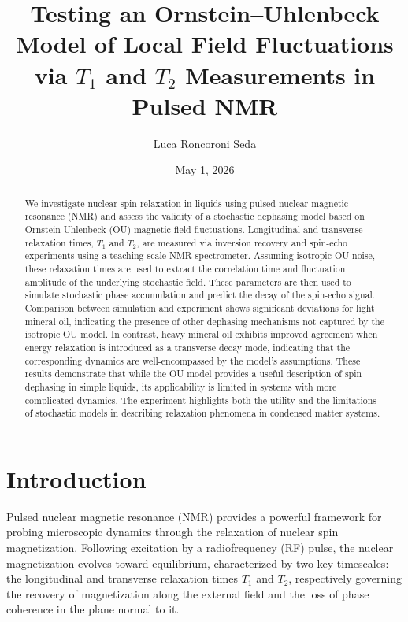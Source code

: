 \documentclass[%
 reprint,
 amsmath,amssymb,
 aps,
]{revtex4-2}
\begin{document}

\title{Testing an Ornstein--Uhlenbeck Model of Local Field Fluctuations via $T_1$ and $T_2$ Measurements in Pulsed NMR}%


\author{Luca Roncoroni Seda}

\date{May 1, 2026}
    
\begin{abstract}
    We investigate nuclear spin relaxation in liquids using pulsed nuclear magnetic resonance (NMR) and assess the validity of a stochastic dephasing model based on Ornstein-Uhlenbeck (OU) magnetic field fluctuations. Longitudinal and transverse relaxation times, $T_1$ and $T_2$, are measured via inversion recovery and spin-echo experiments using a teaching-scale NMR spectrometer. Assuming isotropic OU noise, these relaxation times are used to extract the correlation time and fluctuation amplitude of the underlying stochastic field. These parameters are then used to simulate stochastic phase accumulation and predict the decay of the spin-echo signal. Comparison between simulation and experiment shows significant deviations for light mineral oil, indicating the presence of other dephasing mechanisms not captured by the isotropic OU model. In contrast, heavy mineral oil exhibits improved agreement when energy relaxation is introduced as a transverse decay mode, indicating that the corresponding dynamics are well-encompassed by the model's assumptions. These results demonstrate that while the OU model provides a useful description of spin dephasing in simple liquids, its applicability is limited in systems with more complicated dynamics. The experiment highlights both the utility and the limitations of stochastic models in describing relaxation phenomena in condensed matter systems.
\end{abstract}

\maketitle

\section{Introduction}
\label{sec:intro}
Pulsed nuclear magnetic resonance (NMR) provides a powerful framework for probing microscopic dynamics through the relaxation of nuclear spin magnetization. Following excitation by a radiofrequency (RF) pulse, the nuclear magnetization evolves toward equilibrium, characterized by two key timescales: the longitudinal and transverse relaxation times $T_1$ and $T_2$, respectively governing the recovery of magnetization along the external field and the loss of phase coherence in the plane normal to it.
\end{document}
